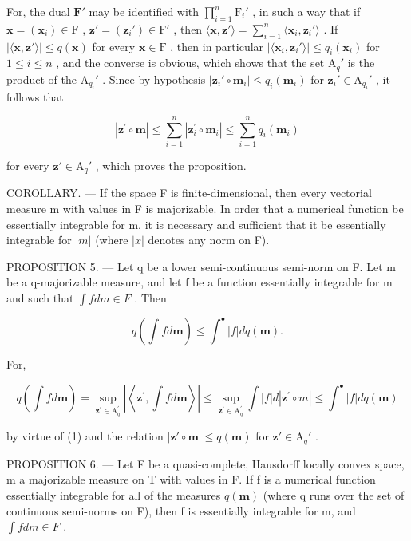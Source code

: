 For, the dual \(\mathbf{F}'\) may be identified with \(\prod_{i=1}^{n} \mathrm{F}_i'\) , in such a way that if \(\mathbf{x} = (\mathbf{x}_i) \in \mathrm{F}\) , \(\mathbf{z}' = (\mathbf{z}_i') \in \mathrm{F}'\) , then \(\langle \mathbf{x}, \mathbf{z}' \rangle = \sum_{i=1}^{n} \langle \mathbf{x}_i, \mathbf{z}_i' \rangle\) . If \(|\langle \mathbf{x}, \mathbf{z}' \rangle| \leqslant q(\mathbf{x})\) for every \(\mathbf{x} \in \mathrm{F}\) , then in particular \(|\langle \mathbf{x}_i, \mathbf{z}_i' \rangle| \leqslant q_i(\mathbf{x}_i)\) for \(1 \leqslant i \leqslant n\) , and the converse is obvious, which shows that the set \(\mathrm{A}_q'\) is the product of the \(\mathrm{A}_{q_i}'\) . Since by hypothesis \(|\mathbf{z}_i' \circ \mathbf{m}_i| \leqslant q_i(\mathbf{m}_i)\) for \(\mathbf{z}_i' \in \mathrm{A}_{q_i}'\) , it follows that

\[
\left| \mathbf {z} ^ {\prime} \circ \mathbf {m} \right| \leqslant \sum_ {i = 1} ^ {n} \left| \mathbf {z} _ {i} ^ {\prime} \circ \mathbf {m} _ {i} \right| \leqslant \sum_ {i = 1} ^ {n} q _ {i} (\mathbf {m} _ {i})
\]

for every \(\mathbf{z}' \in \mathrm{A}_q'\) , which proves the proposition.

COROLLARY. --- If the space F is finite-dimensional, then every vectorial measure m with values in F is majorizable. In order that a numerical function be essentially integrable for m, it is necessary and sufficient that it be essentially integrable for \(|m|\) (where \(|x|\) denotes any norm on F).

PROPOSITION 5. --- Let q be a lower semi-continuous semi-norm on F. Let m be a q-majorizable measure, and let f be a function essentially integrable for m and such that \(\int f dm \in F\) . Then

\[
q \left(\int f d \mathbf {m}\right) \leqslant \int^ {\bullet} | f | d q (\mathbf {m}).
\]

For,

\[
q \left(\int f d \mathbf {m}\right) = \sup _ {\mathbf {z} ^ {\prime} \in \mathrm{A} _ {q} ^ {\prime}} \left| \left\langle \mathbf {z} ^ {\prime}, \int f d \mathbf {m} \right\rangle \right| \leqslant \sup _ {\mathbf {z} ^ {\prime} \in \mathrm{A} _ {q} ^ {\prime}} \int | f | d | \mathbf {z} ^ {\prime} \circ m | \leqslant \int^ {\bullet} | f | d q (\mathbf {m})
\]

by virtue of (1) and the relation \(|\mathbf{z}' \circ \mathbf{m}| \leqslant q(\mathbf{m})\) for \(\mathbf{z}' \in \mathrm{A}_q'\) .

PROPOSITION 6. --- Let F be a quasi-complete, Hausdorff locally convex space, m a majorizable measure on T with values in F. If f is a numerical function essentially integrable for all of the measures \(q(\mathbf{m})\) (where q runs over the set of continuous semi-norms on F), then f is essentially integrable for m, and \(\int f dm \in F\) .

